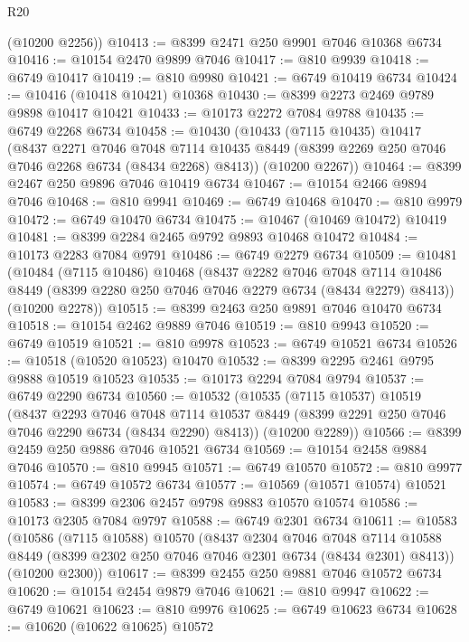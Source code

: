 \begin{lexlean}{R20}
\begin{coremodule}
{      (@10200 @2256))
@10413 := @8399 @2471 @250 @9901 @7046 @10368 @6734
@10416 := @10154 @2470 @9899 @7046
@10417 := @810 @9939
@10418 := @6749 @10417
@10419 := @810 @9980
@10421 := @6749 @10419 @6734
@10424 := @10416 (@10418 @10421) @10368
@10430 := @8399 @2273 @2469 @9789 @9898 @10417 @10421
@10433 := @10173 @2272 @7084 @9788
@10435 := @6749 @2268 @6734
@10458 := @10430
    (@10433
      (@7115 @10435)
      @10417
      (@8437
        @2271
        @7046
        @7048
        @7114
        @10435
        @8449
        (@8399 @2269 @250 @7046 @7046 @2268 @6734 (@8434 @2268) @8413))
      (@10200 @2267))
@10464 := @8399 @2467 @250 @9896 @7046 @10419 @6734
@10467 := @10154 @2466 @9894 @7046
@10468 := @810 @9941
@10469 := @6749 @10468
@10470 := @810 @9979
@10472 := @6749 @10470 @6734
@10475 := @10467 (@10469 @10472) @10419
@10481 := @8399 @2284 @2465 @9792 @9893 @10468 @10472
@10484 := @10173 @2283 @7084 @9791
@10486 := @6749 @2279 @6734
@10509 := @10481
    (@10484
      (@7115 @10486)
      @10468
      (@8437
        @2282
        @7046
        @7048
        @7114
        @10486
        @8449
        (@8399 @2280 @250 @7046 @7046 @2279 @6734 (@8434 @2279) @8413))
      (@10200 @2278))
@10515 := @8399 @2463 @250 @9891 @7046 @10470 @6734
@10518 := @10154 @2462 @9889 @7046
@10519 := @810 @9943
@10520 := @6749 @10519
@10521 := @810 @9978
@10523 := @6749 @10521 @6734
@10526 := @10518 (@10520 @10523) @10470
@10532 := @8399 @2295 @2461 @9795 @9888 @10519 @10523
@10535 := @10173 @2294 @7084 @9794
@10537 := @6749 @2290 @6734
@10560 := @10532
    (@10535
      (@7115 @10537)
      @10519
      (@8437
        @2293
        @7046
        @7048
        @7114
        @10537
        @8449
        (@8399 @2291 @250 @7046 @7046 @2290 @6734 (@8434 @2290) @8413))
      (@10200 @2289))
@10566 := @8399 @2459 @250 @9886 @7046 @10521 @6734
@10569 := @10154 @2458 @9884 @7046
@10570 := @810 @9945
@10571 := @6749 @10570
@10572 := @810 @9977
@10574 := @6749 @10572 @6734
@10577 := @10569 (@10571 @10574) @10521
@10583 := @8399 @2306 @2457 @9798 @9883 @10570 @10574
@10586 := @10173 @2305 @7084 @9797
@10588 := @6749 @2301 @6734
@10611 := @10583
    (@10586
      (@7115 @10588)
      @10570
      (@8437
        @2304
        @7046
        @7048
        @7114
        @10588
        @8449
        (@8399 @2302 @250 @7046 @7046 @2301 @6734 (@8434 @2301) @8413))
      (@10200 @2300))
@10617 := @8399 @2455 @250 @9881 @7046 @10572 @6734
@10620 := @10154 @2454 @9879 @7046
@10621 := @810 @9947
@10622 := @6749 @10621
@10623 := @810 @9976
@10625 := @6749 @10623 @6734
@10628 := @10620 (@10622 @10625) @10572
}
\end{coremodule}
\end{lexlean}
